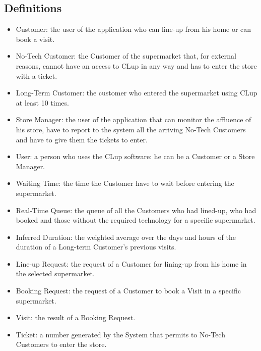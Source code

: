 \subsection{Definitions}

\begin{itemize}
	\item Customer: the user of the application who can line-up from his home or can book a visit.
	\item No-Tech Customer: the Customer of the supermarket that, for external reasons, cannot have an access to CLup in any way and has to enter the store with a ticket.
	\item Long-Term Customer: the customer who entered the supermarket using CLup at least 10 times.
	\item Store Manager: the user of the application that can monitor the affluence of his store, have to report to the system all the arriving No-Tech Customers and have to give them the tickets to enter.
	\item User: a person who uses the CLup software: he can be a Customer or a Store Manager.
	\item Waiting Time: the time the Customer have to wait before entering the supermarket.
	\item Real-Time Queue: the queue of all the Customers who had lined-up, who had booked and those without the required technology for a specific supermarket.
	\item Inferred Duration: the weighted average over the days and hours of the duration of a Long-term Customer's previous visits.
	\item Line-up Request: the request of a Customer for lining-up from his home in the selected supermarket.
	\item Booking Request: the request of a Customer to book a Visit in a specific supermarket.
	\item Visit: the result of a Booking Request.
	\item Ticket: a number generated by the System that permits to No-Tech Customers to enter the store.
\end{itemize}



 
 